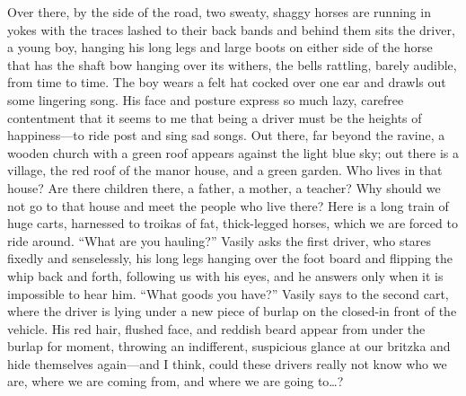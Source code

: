 Over there, by the side of the road, two sweaty, shaggy horses are running in yokes with the traces lashed to their back bands and behind them sits the driver, a young boy, hanging his long legs and large boots on either side of the horse that has the shaft bow hanging over its withers, the bells rattling, barely audible, from time to time. The boy wears a felt hat cocked over one ear and drawls out some lingering song. His face and posture express so much lazy, carefree contentment that it seems to me that being a driver must be the heights of happiness---to ride post and sing sad songs. Out there, far beyond the ravine, a wooden church with a green roof appears against the light blue sky; out there is a village, the red roof of the manor house, and a green garden. Who lives in that house? Are there children there, a father, a mother, a teacher? Why should we not go to that house and meet the people who live there? Here is a long train of huge carts, harnessed to troikas of fat, thick-legged horses, which we are forced to ride around. ``What are you hauling?'' Vasily asks the first driver, who stares fixedly and senselessly, his long legs hanging over the foot board and flipping the whip back and forth, following us with his eyes, and he answers only when it is impossible to hear him. ``What goods you have?'' Vasily says to the second cart, where the driver is lying under a new piece of burlap on the closed-in front of the vehicle. His red hair, flushed face, and reddish beard appear from under the burlap for moment, throwing an indifferent, suspicious glance at our britzka and hide themselves again---and I think, could these drivers really not know who we are, where we are coming from, and where we are going to\ldots{}?

